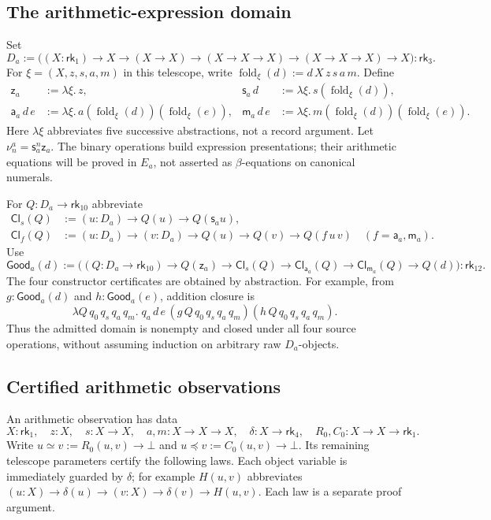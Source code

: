 \documentclass[11pt,a4paper]{article}
\newcommand{\rk}[1]{\mathsf{rk}_{#1}}
\newcommand{\Da}{D_{\!a}}
\newcommand{\za}{\mathsf z_a}
\newcommand{\sa}{\mathsf s_a}
\newcommand{\adda}{\mathsf a_a}
\newcommand{\ma}{\mathsf m_a}
\newcommand{\Ea}{E_a}
\newcommand{\Gooda}{\mathsf{Good}_a}
\newcommand{\nua}[1]{\nu^{a}_{#1}}
\theoremstyle{remark}\newtheorem*{remark}{Remark}
\begin{document}
\subsection{The arithmetic-expression domain}
Set
\[
 \Da:=\bigl((X:\rk1)\to X\to(X\to X)\to(X\to X\to X)
                    \to(X\to X\to X)\to X\bigr):\rk3.
\]
For $\xi=(X,z,s,a,m)$ in this telescope, write
$\operatorname{fold}_{\xi}(d):=d\,X\,z\,s\,a\,m$. Define
\begin{align*}
 \za&:=\lambda\xi.\,z,&
 \sa\,d&:=\lambda\xi.\,s(\operatorname{fold}_{\xi}(d)),\\
 \adda\,d\,e&:=\lambda\xi.\,a(\operatorname{fold}_{\xi}(d))
                          (\operatorname{fold}_{\xi}(e)),&
 \ma\,d\,e&:=\lambda\xi.\,m(\operatorname{fold}_{\xi}(d))
                          (\operatorname{fold}_{\xi}(e)).
\end{align*}
Here $\lambda\xi$ abbreviates five successive abstractions, not a record
argument. Let $\nua n=\sa^n\za$. The binary operations build expression
presentations; their arithmetic equations will be proved in $\Ea$, not
asserted as $\beta$-equations on canonical numerals.

For $Q:\Da\to\rk{10}$ abbreviate
\begin{align*}
 \mathsf{Cl}_s(Q)&:=(u:\Da)\to Q(u)\to Q(\sa u),\\
 \mathsf{Cl}_f(Q)&:=(u:\Da)\to(v:\Da)\to Q(u)\to Q(v)\to Q(f\,u\,v)
       \quad(f=\adda,\ma).
\end{align*}
Use
\[
 \Gooda(d):=\bigl((Q:\Da\to\rk{10})\to Q(\za)
 \to\mathsf{Cl}_s(Q)\to\mathsf{Cl}_{\adda}(Q)
 \to\mathsf{Cl}_{\ma}(Q)\to Q(d)\bigr):\rk{12}.
\]
The four constructor certificates are obtained by abstraction. For example,
from $g:\Gooda(d)$ and $h:\Gooda(e)$, addition closure is
\[
 \lambda Q\,q_0\,q_s\,q_a\,q_m.\;
 q_a\,d\,e\,(g\,Q\,q_0\,q_s\,q_a\,q_m)
             (h\,Q\,q_0\,q_s\,q_a\,q_m).
\]
Thus the admitted domain is nonempty and closed under all four source
operations, without assuming induction on arbitrary raw $\Da$-objects.

\subsection{Certified arithmetic observations}\label{sec:arith-obs}
An arithmetic observation has data
\[
 X:\rk1,\quad z:X,\quad s:X\to X,\quad a,m:X\to X\to X,
 \quad\delta:X\to\rk4,\quad R_0,C_0:X\to X\to\rk1.
\]
Write $u\simeq v:=R_0(u,v)\to\bot$ and
$u\preceq v:=C_0(u,v)\to\bot$. Its remaining telescope parameters
certify the following laws. Each object variable is immediately guarded
by $\delta$; for example $H(u,v)$ abbreviates
$(u:X)\to\delta(u)\to(v:X)\to\delta(v)\to H(u,v)$.
Each law is a separate proof argument.
\end{document}
